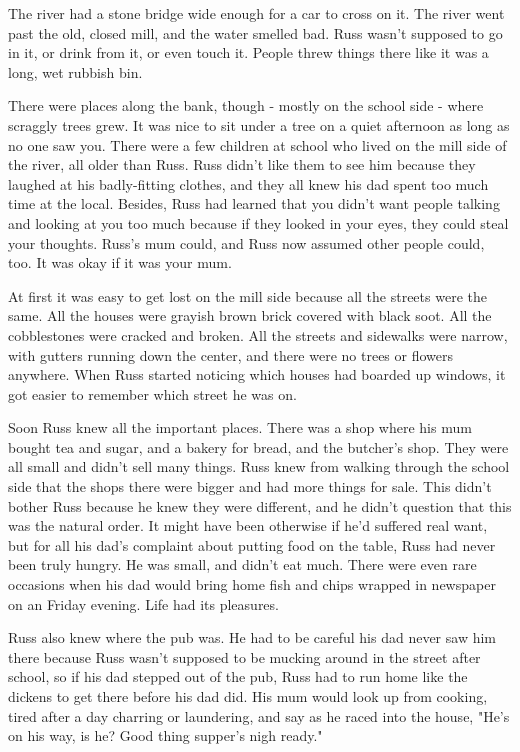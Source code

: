 \documentclass[a4paper,11pt]{article}
\begin{document}
The river had a stone bridge wide enough for a car to cross on it. The river went past the old, closed mill, and the water smelled bad. Russ wasn't supposed to go in it, or drink from it, or even touch it. People threw things there like it was a long, wet rubbish bin.

There were places along the bank, though - mostly on the school side - where scraggly trees grew. It was nice to sit under a tree on a quiet afternoon as long as no one saw you. There were a few children at school who lived on the mill side of the river, all older than Russ. Russ didn't like them to see him because they laughed at his badly-fitting clothes, and they all knew his dad spent too much time at the local. Besides, Russ had learned that you didn't want people talking and looking at you too much because if they looked in your eyes, they could steal your thoughts. Russ's mum could, and Russ now assumed other people could, too. It was okay if it was your mum.

At first it was easy to get lost on the mill side because all the streets were the same. All the houses were grayish brown brick covered with black soot. All the cobblestones were cracked and broken. All the streets and sidewalks were narrow, with gutters running down the center, and there were no trees or flowers anywhere. When Russ started noticing which houses had boarded up windows, it got easier to remember which street he was on.

Soon Russ knew all the important places. There was a shop where his mum bought tea and sugar, and a bakery for bread, and the butcher's shop. They were all small and didn't sell many things. Russ knew from walking through the school side that the shops there were bigger and had more things for sale. This didn't bother Russ because he knew they were different, and he didn't question that this was the natural order. It might have been otherwise if he'd suffered real want, but for all his dad's complaint about putting food on the table, Russ had never been truly hungry. He was small, and didn't eat much. There were even rare occasions when his dad would bring home fish and chips wrapped in newspaper on an Friday evening. Life had its pleasures.

Russ also knew where the pub was. He had to be careful his dad never saw him there because Russ wasn't supposed to be mucking around in the street after school, so if his dad stepped out of the pub, Russ had to run home like the dickens to get there before his dad did. His mum would look up from cooking, tired after a day charring or laundering, and say as he raced into the house, "He's on his way, is he? Good thing supper's nigh ready."
\end{document}
